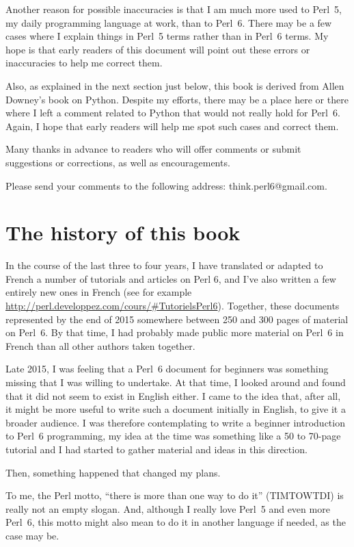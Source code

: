 Another reason for possible inaccuracies is that I am much 
more used to Perl~5, my daily programming language at work, 
than to Perl~6. There may be a few cases where I explain 
things in Perl~5 terms rather than in Perl~6 terms. My hope 
is that early readers of this document will point out these 
errors or inaccuracies to help me correct them.

Also, as explained in the next section just below, this book
is derived from Allen Downey's book on Python. Despite 
my efforts, there may be a place here or there where I left 
a comment related to Python that would not really hold for Perl~6. 
Again, I hope that early readers will help me spot such 
cases and correct them.

Many thanks in advance to readers who will offer comments 
or submit suggestions or corrections, as well as encouragements.

Please send your comments to the following address: 
think.perl6@gmail.com.

\section*{The history of this book}

In the course of the last three to four years, I  
have translated or adapted to French a number of tutorials 
and articles on Perl 6, and I've also written a few entirely 
new ones in French (see for example 
\url{http://perl.developpez.com/cours/#TutorielsPerl6}). 
Together, these documents represented by the end of 2015 
somewhere between 250 and 300 pages of material on Perl~6. 
By that time, I had 
probably made public more material on Perl~6 in French than 
all other authors taken together.

Late 2015, I was feeling that a Perl~6 document for beginners 
was something missing that I was willing to undertake. At that 
time, I looked around and found that it did not seem to 
exist in English either. I came to the idea that, after all, 
it might be more useful to write such a document initially 
in English, to give it a broader audience. I was therefore 
contemplating to write a beginner introduction to Perl~6 
programming, my idea at the time was something like a 50 to 
70-page tutorial and I had started to gather material and ideas 
in this direction.

Then, something happened that changed my plans.

To me, the Perl motto, ``there is more than one way to 
do it'' (TIMTOWTDI) is really not an empty slogan. And, although 
I really love Perl~5 and even more Perl~6, this motto might 
also mean to do it in another language if needed, as the 
case may be.


